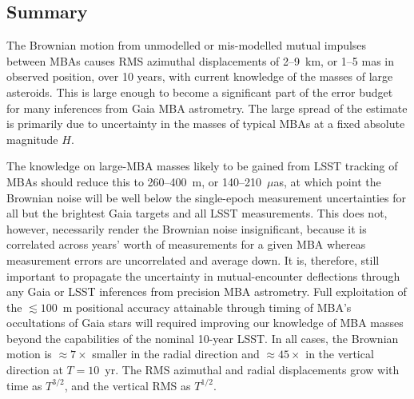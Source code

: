 \documentclass[linenumbers, onecolumn]{aastex631}
\newcommand\edited[1]{{\color{red} {#1}}}
\newcommand{\uas}{$\mu$as}
\begin{document}
\subsection{Summary}

The Brownian motion from unmodelled or mis-modelled
mutual impulses between MBAs causes RMS azimuthal displacements of
\edited{2--9~km, or 1--5 mas in observed position,} over 10 years, with
current knowledge of the masses of large asteroids.  This is large
enough to become a significant part of the error budget for many
inferences from Gaia MBA astrometry.  \edited{The large spread of the estimate is primarily due to uncertainty in the masses of typical MBAs at a fixed absolute magnitude $H$.}

The knowledge on large-MBA
masses likely to be gained from LSST tracking of MBAs should reduce
this \edited{to 260--400~m, or 140--210~\uas, at which point the Brownian noise will be
well below the single-epoch measurement uncertainties for all but the brightest
Gaia targets and all LSST measurements.  This does not, however, necessarily
render the Brownian noise insignificant, because it is correlated across years'
worth of measurements for a given MBA whereas measurement errors are
uncorrelated and average down.  It is, therefore, still important to propagate
the uncertainty in mutual-encounter deflections through any Gaia or LSST
inferences from precision MBA astrometry.  Full exploitation of the
$\lesssim100$~m positional accuracy attainable through timing of MBA's
occultations of Gaia stars will required improving our knowledge of MBA masses
beyond the capabilities of the nominal 10-year LSST.}
In all cases, the Brownian motion is
$\approx7\times$ smaller in the radial direction and $\approx45\times$
in the vertical direction at $T=10$~yr.  The RMS azimuthal and radial displacements
grow with time as $T^{3/2}$, and the vertical RMS as $T^{1/2}.$
\end{document}
